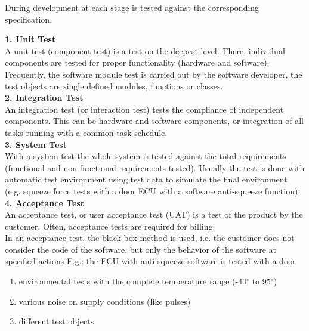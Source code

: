 
During development at each stage is tested against the corresponding specification.\\
\newpage

\textbf{1. Unit Test}\\

A unit test (component test) is a test on the deepest level. There, individual components are tested for proper functionality (hardware and software). Frequently, the software module test is carried out by the software developer, the test objects are single defined modules, functions or classes.\\

\textbf{2. Integration Test}\\

An integration test (or interaction test) tests the compliance of independent components. This can be hardware and software components, or integration of all tasks running with a common task schedule.\\

\textbf{3. System Test}\\

With a system test the whole system is tested against the total requirements (functional and non functional requirements tested). Usually the test is done with automatic test environment using test data to simulate the final environment (e.g. squeeze force tests with a door ECU with a software anti-squeeze function).\\

\textbf{ 4. Acceptance Test}\\

An acceptance test, or user acceptance test (UAT) is a test of the product by the customer. Often, acceptance tests are required for billing. \\
In an acceptance test, the black-box method is used, i.e. the customer does not consider the code of the software, but only the behavior of the software at specified actions E.g.: the ECU with anti-squeeze software is tested with a door

\begin{enumerate}
\item  environmental tests with the complete temperature range (-40$\mathrm{{}^\circ}$ to 95$\mathrm{{}^\circ}$)
\item  various noise on supply conditions (like pulses)
\item  different test objects
\end{enumerate}


